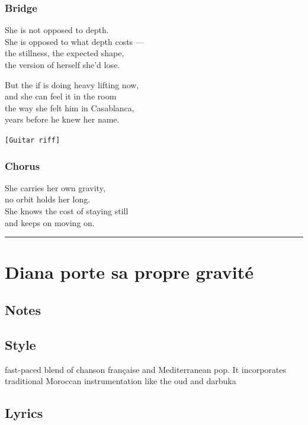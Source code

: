 \documentclass[]{article}
\begin{document}
\subsubsection{Bridge}\label{bridge-1}

She is not opposed to depth.\\
She is opposed to what depth costs ---\\
the stillness, the expected shape,\\
the version of herself she'd lose.

But the if is doing heavy lifting now,\\
and she can feel it in the room\\
the way she felt him in Casablanca,\\
years before he knew her name.

\texttt{{[}Guitar\ riff{]}}

\subsubsection{Chorus}\label{chorus-7}

She carries her own gravity,\\
no orbit holds her long.\\
She knows the cost of staying still\\
and keeps on moving on.

\begin{center}\rule{0.5\linewidth}{0.5pt}\end{center}

\section{Diana porte sa propre
gravité}\label{diana-porte-sa-propre-gravituxe9}

\subsection{Notes}\label{notes-10}

\subsection{Style}\label{style-10}

fast-paced blend of chanson française and Mediterranean pop. It
incorporates traditional Moroccan instrumentation like the oud and
darbuka

\subsection{Lyrics}\label{lyrics-10}
\end{document}
